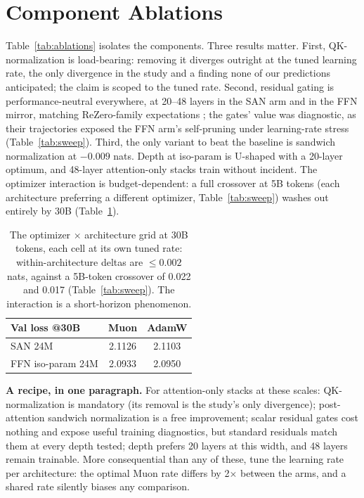 \documentclass[letterpaper]{article} %
\begin{document}
\section{Component Ablations}



Table~\ref{tab:ablations} isolates the components. Three results matter.
First, QK-normalization is load-bearing: removing it diverges outright at
the tuned learning rate, the only divergence in the study and a finding
none of our predictions anticipated; the claim is scoped to the tuned
rate. Second, residual gating is performance-neutral
everywhere, at 20--48 layers in the SAN arm and in the FFN mirror, matching
ReZero-family expectations \citep{bachlechner2020rezero}; the gates'
value was diagnostic, as their trajectories exposed the FFN arm's
self-pruning under learning-rate stress (Table~\ref{tab:sweep}). Third, the only variant to beat the baseline is sandwich
normalization \citep{shleifer2021normformer} at $-0.009$ nats. Depth at
iso-param is U-shaped with a 20-layer optimum, and 48-layer attention-only
stacks train without incident. The optimizer interaction is
budget-dependent: a full crossover at 5B tokens (each architecture
preferring a different optimizer, Table~\ref{tab:sweep}) washes out
entirely by 30B (Table~\ref{tab:opt}).

\begin{table}[tb]\centering\footnotesize
\setlength{\tabcolsep}{5pt}
\begin{tabular}{@{}lcc@{}}
\toprule
Val loss @30B & Muon & AdamW \\
\midrule
SAN 24M & 2.1126 & 2.1103 \\
FFN iso-param 24M & 2.0933 & 2.0950 \\
\bottomrule
\end{tabular}
\caption{The optimizer $\times$ architecture grid at 30B tokens, each
cell at its own tuned rate: within-architecture deltas are $\le 0.002$
nats, against a 5B-token crossover of 0.022 and 0.017
(Table~\ref{tab:sweep}). The interaction is a short-horizon phenomenon.}
\label{tab:opt}
\end{table}

\textbf{A recipe, in one paragraph.} For attention-only stacks at these
scales: QK-normalization is mandatory (its removal is the study's only
divergence); post-attention sandwich normalization is a free improvement;
scalar residual gates cost nothing and expose useful training
diagnostics, but standard residuals match them at every depth tested;
depth prefers 20 layers at this width, and 48 layers remain trainable.
More consequential than any of these, tune the learning rate per
architecture: the optimal Muon rate differs by 2$\times$ between the
arms, and a shared rate silently biases any comparison.
\end{document}
